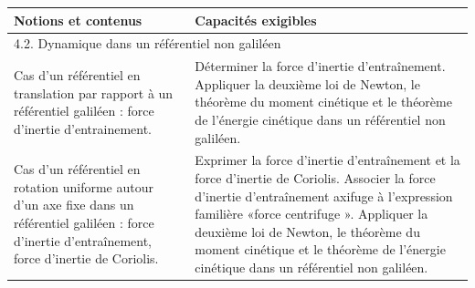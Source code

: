 \begin{tabularx}{\textwidth}[t]{|X|X|}

  \hline \textbf{Notions et contenus} & \textbf{Capacités exigibles} \\
  \hline  \multicolumn{2}{|l|}{ 4.2. Dynamique dans un référentiel non galiléen} \\
  \hline 
    Cas d'un référentiel en translation par 
    rapport à un référentiel galiléen : force 
    d'inertie d'entrainement.
   & 
    Déterminer la force d'inertie d'entraînement. 
    Appliquer la deuxième loi de Newton, le 
    théorème du moment cinétique et le théorème 
    de l'énergie cinétique dans un référentiel non 
    galiléen.
  \\
  \hline 
    Cas d'un référentiel en rotation uniforme 
    autour d'un axe fixe dans un référentiel 
    galiléen : force d'inertie d'entraînement, 
    force d'inertie de Coriolis.
   & 
    Exprimer la force d'inertie d'entraînement et la 
    force d'inertie de Coriolis. 
    Associer la force d'inertie d'entraînement 
    axifuge à l'expression familière «force 
    centrifuge ». 
    Appliquer la deuxième loi de Newton, le 
    théorème du moment cinétique et le théorème 
    de l'énergie cinétique dans un référentiel non 
    galiléen.
  \\
  \hline
\end{tabularx}
